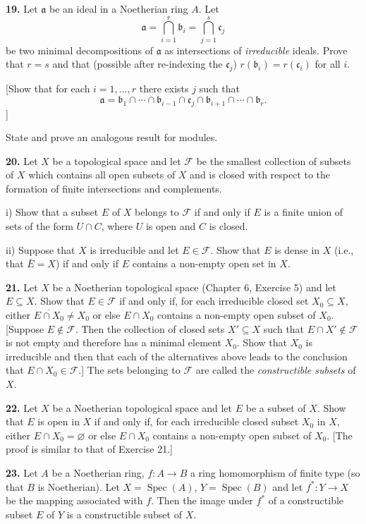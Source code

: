 \medskip
\noindent\textbf{19.} Let $\mathfrak a$ be an ideal in a Noetherian ring $A$.  Let
\[
\mathfrak a=\bigcap_{i=1}^r\mathfrak b_i=\bigcap_{j=1}^s\mathfrak c_j
\]
be two minimal decompositions of $\mathfrak a$ as intersections of \emph{irreducible} ideals.  Prove
that $r=s$ and that (possible after re-indexing the $\mathfrak c_j$) $r(\mathfrak b_i)=r(\mathfrak c_i)$ for all $i$.

[Show that for each $i=1,\ldots,r$ there exists $j$ such that
\[
\mathfrak a=\mathfrak b_1\cap\cdots\cap\mathfrak b_{i-1}\cap\mathfrak c_j\cap\mathfrak b_{i+1}\cap\cdots\cap\mathfrak b_r.
\]
]

State and prove an analogous result for modules.

\medskip
\noindent\textbf{20.} Let $X$ be a topological space and let $\mathcal F$ be the smallest collection of subsets of $X$
which contains all open subsets of $X$ and is closed with respect to the formation
of finite intersections and complements.

i) Show that a subset $E$ of $X$ belongs to $\mathcal F$ if and only if $E$ is a finite union of sets
of the form $U\cap C$, where $U$ is open and $C$ is closed.

ii) Suppose that $X$ is irreducible and let $E\in\mathcal F$.  Show that $E$ is dense in $X$
(i.e., that $\bar E=X$) if and only if $E$ contains a non-empty open set in $X$.

\medskip
\noindent\textbf{21.} Let $X$ be a Noetherian topological space (Chapter 6, Exercise 5) and let $E\subseteq X$.
Show that $E\in\mathcal F$ if and only if, for each irreducible closed set $X_0\subseteq X$, either
$\overline{E\cap X_0}\ne X_0$ or else $E\cap X_0$ contains a non-empty open subset of $X_0$.  [Suppose
$E\notin\mathcal F$.  Then the collection of closed sets $X'\subseteq X$ such that $E\cap X'\notin\mathcal F$ is not
empty and therefore has a minimal element $X_0$.  Show that $X_0$ is irreducible and
then that each of the alternatives above leads to the conclusion that $E\cap X_0\in\mathcal F$.]
The sets belonging to $\mathcal F$ are called the \emph{constructible subsets} of $X$.

\medskip
\noindent\textbf{22.} Let $X$ be a Noetherian topological space and let $E$ be a subset of $X$.  Show that $E$
is open in $X$ if and only if, for each irreducible closed subset $X_0$ in $X$, either
$E\cap X_0=\varnothing$ or else $E\cap X_0$ contains a non-empty open subset of $X_0$.  [The
proof is similar to that of Exercise 21.]

\medskip
\noindent\textbf{23.} Let $A$ be a Noetherian ring, $f:A\longrightarrow B$ a ring homomorphism of finite type (so
that $B$ is Noetherian).  Let $X=\operatorname{Spec}(A)$, $Y=\operatorname{Spec}(B)$ and let $f^*:Y\longrightarrow X$ be
the mapping associated with $f$.  Then the image under $f^*$ of a constructible
subset $E$ of $Y$ is a constructible subset of $X$.

